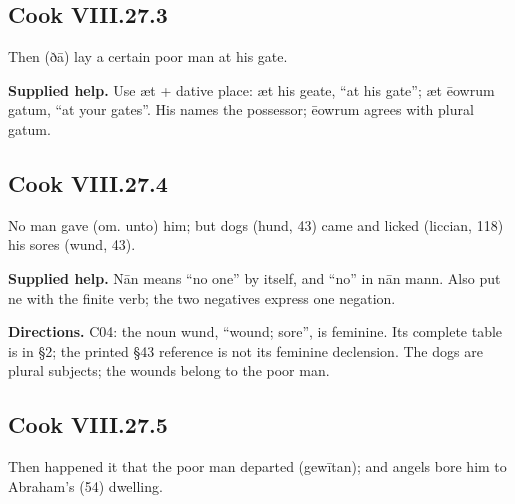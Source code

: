 \par\begin{minipage}{\linewidth}\raggedright
\subsection*{Cook VIII.27.3}

Then (ðā) lay a certain poor man at his gate.

\end{minipage}\par\addvspace{4pt}

\textbf{Supplied help.} Use æt + dative place: æt his geate, “at his gate”; æt ēowrum gatum, “at your gates”. His names the possessor; ēowrum agrees with plural gatum.

\par\begin{minipage}{\linewidth}\raggedright
\subsection*{Cook VIII.27.4}

No man gave (om. unto) him; but dogs (hund, 43) came and licked (liccian, 118) his sores (wund, 43).

\textbf{Supplied help.} Nān means “no one” by itself, and “no” in nān mann. Also put ne with the finite verb; the two negatives express one negation.

\textbf{Directions.} C04: the noun wund, “wound; sore”, is feminine. Its complete table is in §2; the printed §43 reference is not its feminine declension. The dogs are plural subjects; the wounds belong to the poor man.

\end{minipage}\par\addvspace{4pt}

\par\begin{minipage}{\linewidth}\raggedright
\subsection*{Cook VIII.27.5}

Then happened it that the poor man departed (gewītan); and angels bore him to Abraham’s (54) dwelling.

\end{minipage}\par\addvspace{4pt}

